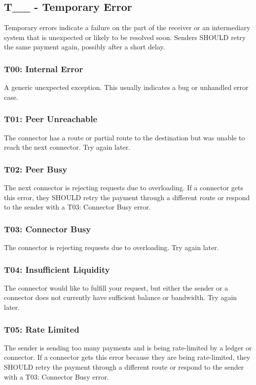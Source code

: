 \documentclass[11pt,twoside,a4paper]{article}
\begin{document}
\subsection{T\_\_ - Temporary Error}
Temporary errors indicate a failure on the part of the receiver or an intermediary system that is unexpected or likely to be resolved soon. Senders SHOULD retry the same payment again, possibly after a short delay.

\subsubsection{T00: Internal Error}
A generic unexpected exception. This usually indicates a bug or unhandled error case.

\subsubsection{T01: Peer Unreachable}
The connector has a route or partial route to the destination but was unable to reach the next connector. Try again later.

\subsubsection{T02: Peer Busy}
The next connector is rejecting requests due to overloading. If a connector gets this error, they SHOULD retry the payment through a different route or respond to the sender with a T03: Connector Busy error.

\subsubsection{T03: Connector Busy}
The connector is rejecting requests due to overloading. Try again later.

\subsubsection{T04: Insufficient Liquidity}
The connector would like to fulfill your request, but either the sender or a connector does not currently have sufficient balance or bandwidth. Try again later.

\subsubsection{T05: Rate Limited}
The sender is sending too many payments and is being rate-limited by a ledger or connector. If a connector gets this error because they are being rate-limited, they SHOULD retry the payment through a different route or respond to the sender with a T03: Connector Busy error.
\end{document}
